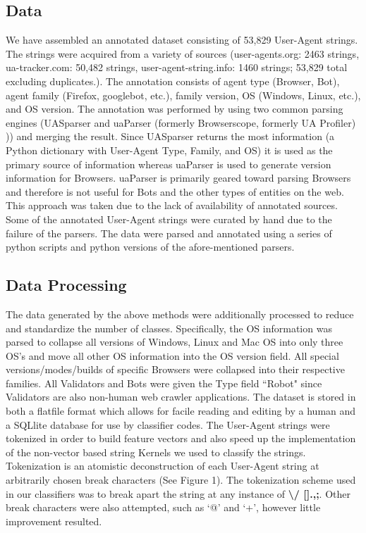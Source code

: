 \documentclass[10pt]{article}
\begin{document}
\begin{multicols}{2}
\subsection{Data}
We have assembled an annotated dataset consisting of 53,829 User-Agent strings.  The strings were acquired from a variety of sources (user-agents.org: 2463 strings, ua-tracker.com: 50,482 strings, user-agent-string.info: 1460 strings; 53,829 total excluding duplicates.).\cite{ua.org,uatracker,uas.info}  The annotation consists of agent type (Browser, Bot), agent family (Firefox, googlebot, etc.), family version, OS (Windows, Linux, etc.), and OS version.  The annotation was performed by using two common parsing engines (UASparser\cite{uas.info} and uaParser (formerly Browserscope, formerly UA Profiler)\cite{uaParser} )) and merging the result.  Since UASparser returns the most information (a Python dictionary with User-Agent Type, Family, and OS) it is used as the primary source of information whereas uaParser is used to generate version information for Browsers.  uaParser is primarily geared toward parsing Browsers and therefore is not useful for Bots and the other types of entities on the web.   This approach was taken due to the lack of availability of annotated sources.  Some of the annotated User-Agent strings were curated by hand due to the failure of the parsers.  The data were parsed and annotated using a series of python scripts and python versions of the afore-mentioned parsers.  
\subsection{Data Processing}
The data generated by the above methods were additionally processed to reduce and standardize the number of classes.  Specifically, the OS information was parsed to collapse all versions of Windows, Linux and Mac OS into only three OS's and move all other OS information into the OS version field.  All special versions/modes/builds of specific Browsers were collapsed into their respective families.  All Validators and Bots were given the Type field ``Robot" since Validators are also non-human web crawler applications.  The dataset is stored in both a flatfile format which allows for facile reading and editing by a human and a SQLlite database for use by classifier codes.  
The User-Agent strings were tokenized in order to build feature vectors and also speed up the implementation of the non-vector based string Kernels we used to classify the strings.  Tokenization is an atomistic deconstruction of each User-Agent string at arbitrarily chosen break characters (See Figure 1).  The tokenization scheme used in our classifiers was to break apart the string at any instance of {\bf \textbackslash / [].,;}.  Other break characters were also attempted, such as `@' and `+', however little improvement resulted.  


\end{multicols}
\end{document}
